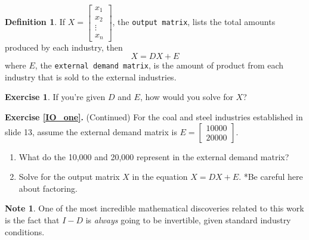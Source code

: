 \documentclass[handout]{beamer}
\newcommand{\fn}{\insertframenumber}
\theoremstyle{definition}
\newtheorem{exercise}{Exercise}
\newtheorem*{defn}{Definition}
\newtheorem*{nb}{Note}
\renewcommand{\emph}[1]{{\color{blue}\texttt{#1}}}
\begin{document}
\begin{frame}{\fn}
\begin{defn}
	If $X=\begin{bmatrix}x_1\\x_2\\\vdots\\x_n\end{bmatrix}$, the \emph{output matrix}, lists the total amounts produced by each industry, then 
	\[X=DX+E\]
	where $E$, the \emph{external demand matrix}, is the amount of product from each industry that is sold to the external industries.
\end{defn}
\begin{exercise}
	If you're given $D$ and $E$, how would you solve for $X$?
\end{exercise}
\end{frame}
\begin{frame}{\fn}
\begin{block}{\textbf{Exercise \ref{IO_one}.} (Continued)}
	For the coal and steel industries established in slide 13, assume the external demand matrix is $E=\begin{bmatrix}10000\\20000\end{bmatrix}$.
	\begin{enumerate}[label=(\alph*)]
		\item What do the 10,000 and 20,000 represent in the external demand matrix?
		\item Solve for the output matrix $X$ in the equation $X=DX+E$. *Be careful here about factoring.
	\end{enumerate}
\end{block}\pause
\begin{nb}
	One of the most incredible mathematical discoveries related to this work is the fact that $I-D$ is \textit{always} going to be invertible, given standard industry conditions.
\end{nb}
\end{frame}
\end{document}
